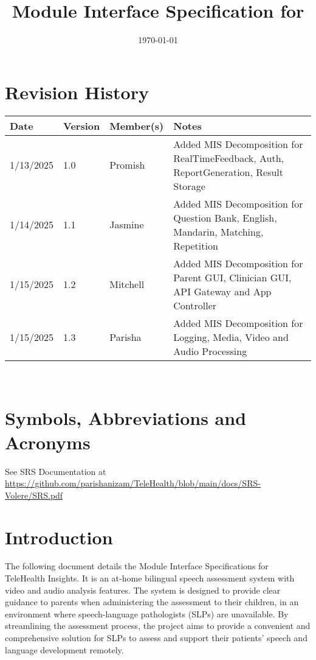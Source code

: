 \documentclass[12pt, titlepage]{article}
\begin{document}
\title{Module Interface Specification for \progname{}}

\author{\authname}

\date{\today}

\maketitle


\section{Revision History}

\begin{tabularx}{\textwidth}{p{3cm}p{2cm}p{3cm}X}
  \toprule {\bf Date} & {\bf Version} & {\bf Member(s)} & {\bf Notes}\\
  \midrule
  1/13/2025 & 1.0 & Promish & Added MIS Decomposition for RealTimeFeedback, Auth, ReportGeneration, Result Storage\\
  1/14/2025 & 1.1 & Jasmine & Added MIS Decomposition for Question Bank, English, Mandarin, Matching, Repetition\\
  1/15/2025 & 1.2 & Mitchell & Added MIS Decomposition for Parent GUI, Clinician GUI, API Gateway and App Controller\\
  1/15/2025 & 1.3 & Parisha & Added MIS Decomposition for Logging, Media, Video and Audio Processing\\
  \bottomrule
  \end{tabularx}

~\newpage

\section{Symbols, Abbreviations and Acronyms}

See SRS Documentation at \url{https://github.com/parishanizam/TeleHealth/blob/main/docs/SRS-Volere/SRS.pdf}

\newpage

\tableofcontents

\newpage


\section{Introduction}

The following document details the Module Interface Specifications for TeleHealth Insights. It is an at-home bilingual speech 
assessment system with video and audio analysis features. The system is designed 
to provide clear guidance to parents when administering the assessment to their 
children, in an environment where speech-language pathologists (SLPs) are 
unavailable. By streamlining the assessment process, the project aims to provide a 
convenient and comprehensive solution for SLPs to assess and support their patients'
speech and language development remotely.
\end{document}
